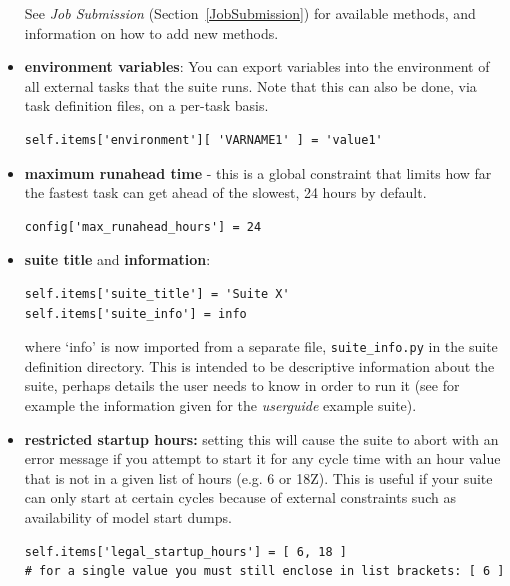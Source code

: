 \documentclass[11pt,a4paper]{article}
\begin{document}
\begin{itemize}
        See {\em Job Submission} (Section~\ref{JobSubmission}) for
        available methods, and information on how to add new methods.

    \item {\bf environment variables}: You can export variables into the 
        environment of all external tasks that the suite runs. Note that
        this can also be done, via task definition files, on a per-task
        basis.

        \begin{lstlisting}
self.items['environment'][ 'VARNAME1' ] = 'value1'
        \end{lstlisting}

    \item {\bf maximum runahead time} - this is a global constraint that
        limits how far the fastest task can get ahead of the slowest, 24
        hours by default.
        
        \begin{lstlisting}
config['max_runahead_hours'] = 24
        \end{lstlisting}


    \item {\bf suite title} and {\bf information}: 

        \begin{lstlisting}
self.items['suite_title'] = 'Suite X'
self.items['suite_info'] = info
        \end{lstlisting}
        where `info' is now imported from a separate file, 
        \lstinline=suite_info.py= in the suite definition directory.
        This is intended to be descriptive information about the suite,
        perhaps details the user needs to know in order to run it (see
        for example the information given for the {\em userguide}
        example suite).

    \item {\bf restricted startup hours:} setting this will cause 
        the suite to abort with an error message if you attempt to
        start it for any cycle time with an hour value that is not in a given
        list of hours (e.g. 6 or 18Z). This is useful if your suite 
        can only start at certain cycles because of external constraints
        such as availability of model start dumps.
        
    \begin{lstlisting}
self.items['legal_startup_hours'] = [ 6, 18 ]
# for a single value you must still enclose in list brackets: [ 6 ] 
    \end{lstlisting}

\end{itemize}
\end{document}
